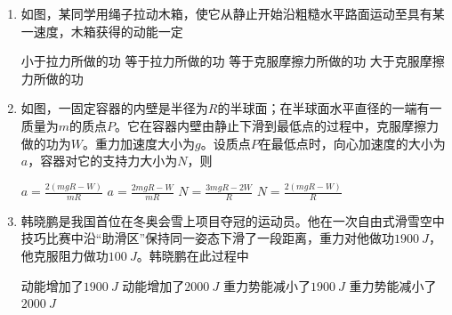 

\begin{enumerate}[leftmargin=0em]
\renewcommand{\labelenumi}{\arabic{enumi}.}




\item
{}
如图，某同学用绳子拉动木箱，使它从静止开始沿粗糙水平路面运动至具有某一速度，木箱获得的动能一定  
\begin{figure}[h!]
\centering

\end{figure}

\fourchoices
{小于拉力所做的功}
{等于拉力所做的功}
{等于克服摩擦力所做的功}
{大于克服摩擦力所做的功}


\item
{}
如图，一固定容器的内壁是半径为$ R $的半球面；在半球面水平直径的一端有一质量为$ m $的质点$ P $。它在容器内壁由静止下滑到最低点的过程中，克服摩擦力做的功为$ W $。重力加速度大小为$ g $。设质点$ P $在最低点时，向心加速度的大小为$ a $，容器对它的支持力大小为$ N $，则  


\begin{minipage}[h!]{0.7\linewidth}
\vspace{0.3em}
\fourchoices
{$ a = \frac { 2 ( m g R - W ) } { m R } $}
{$ a = \frac { 2 m g R - W } { m R } $}
{$ N = \frac { 3 m g R - 2 W } { R } $}
{$ N = \frac { 2 ( m g R - W ) } { R } $}
\vspace{0.3em}
\end{minipage}
\hfill
\begin{minipage}[h!]{0.3\linewidth}
\flushright
\vspace{0.3em}

\vspace{0.3em}
\end{minipage}



\item 
{}
韩晓鹏是我国首位在冬奥会雪上项目夺冠的运动员。他在一次自由式滑雪空中技巧比赛中沿“助滑区”保持同一姿态下滑了一段距离，重力对他做功$ 1900 \ J $，他克服阻力做功$ 100 \ J $。韩晓鹏在此过程中  

\fourchoices
{动能增加了$ 1900 \ J $}
{动能增加了$ 2000 \ J $}
{重力势能减小了$ 1900 \ J $}
{重力势能减小了$ 2000 \ J $}




\end{enumerate}
